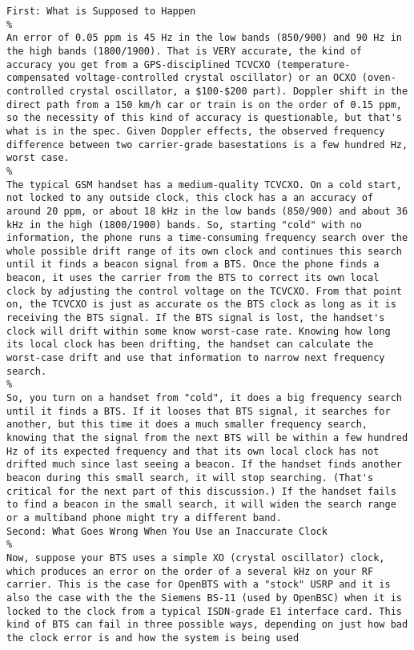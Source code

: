 {\begin{verbatim}
First: What is Supposed to Happen
%
An error of 0.05 ppm is 45 Hz in the low bands (850/900) and 90 Hz in the high bands (1800/1900). That is VERY accurate, the kind of accuracy you get from a GPS-disciplined TCVCXO (temperature-compensated voltage-controlled crystal oscillator) or an OCXO (oven-controlled crystal oscillator, a $100-$200 part). Doppler shift in the direct path from a 150 km/h car or train is on the order of 0.15 ppm, so the necessity of this kind of accuracy is questionable, but that's what is in the spec. Given Doppler effects, the observed frequency difference between two carrier-grade basestations is a few hundred Hz, worst case.
%
The typical GSM handset has a medium-quality TCVCXO. On a cold start, not locked to any outside clock, this clock has a an accuracy of around 20 ppm, or about 18 kHz in the low bands (850/900) and about 36 kHz in the high (1800/1900) bands. So, starting "cold" with no information, the phone runs a time-consuming frequency search over the whole possible drift range of its own clock and continues this search until it finds a beacon signal from a BTS. Once the phone finds a beacon, it uses the carrier from the BTS to correct its own local clock by adjusting the control voltage on the TCVCXO. From that point on, the TCVCXO is just as accurate os the BTS clock as long as it is receiving the BTS signal. If the BTS signal is lost, the handset's clock will drift within some know worst-case rate. Knowing how long its local clock has been drifting, the handset can calculate the worst-case drift and use that information to narrow next frequency search.
%
So, you turn on a handset from "cold", it does a big frequency search until it finds a BTS. If it looses that BTS signal, it searches for another, but this time it does a much smaller frequency search, knowing that the signal from the next BTS will be within a few hundred Hz of its expected frequency and that its own local clock has not drifted much since last seeing a beacon. If the handset finds another beacon during this small search, it will stop searching. (That's critical for the next part of this discussion.) If the handset fails to find a beacon in the small search, it will widen the search range or a multiband phone might try a different band.
Second: What Goes Wrong When You Use an Inaccurate Clock
%
Now, suppose your BTS uses a simple XO (crystal oscillator) clock, which produces an error on the order of a several kHz on your RF carrier. This is the case for OpenBTS with a "stock" USRP and it is also the case with the the Siemens BS-11 (used by OpenBSC) when it is locked to the clock from a typical ISDN-grade E1 interface card. This kind of BTS can fail in three possible ways, depending on just how bad the clock error is and how the system is being used

\end{verbatim}}
